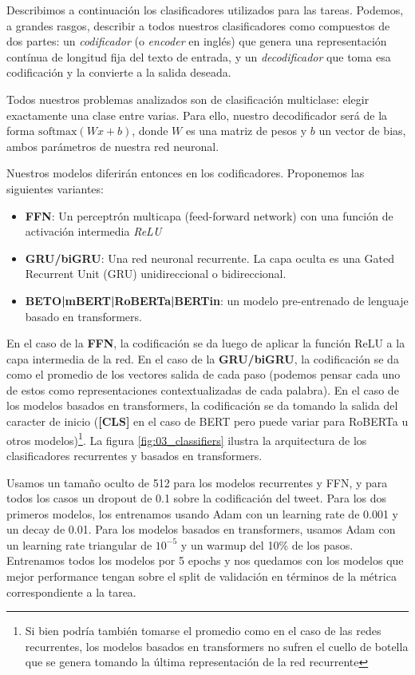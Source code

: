 Describimos a continuación los clasificadores utilizados para las tareas. Podemos, a grandes rasgos, describir a todos nuestros clasificadores como compuestos de dos partes: un \emph{codificador} (o \emph{encoder} en inglés) que genera una representación contínua de longitud fija del texto de entrada, y un \emph{decodificador} que toma esa codificación y la convierte a la salida deseada.

Todos nuestros problemas analizados son de clasificación multiclase: elegir exactamente una clase entre varias. Para ello, nuestro decodificador será de la forma $\text{softmax}(Wx + b)$, donde $W$ es una matriz de pesos y $b$ un vector de bias, ambos parámetros de nuestra red neuronal.

Nuestros modelos diferirán entonces en los codificadores. Proponemos las siguientes variantes:

\begin{itemize}
    \item \textbf{FFN}: Un perceptrón multicapa (feed-forward network) con una función de activación intermedia \emph{ReLU}
    \item \textbf{GRU/biGRU}: Una red neuronal recurrente. La capa oculta es una Gated Recurrent Unit (GRU) unidireccional o bidireccional.
    \item \textbf{BETO|mBERT|RoBERTa|BERTin}: un modelo pre-entrenado de lenguaje basado en transformers.
\end{itemize}

En el caso de la \textbf{FFN}, la codificación se da luego de aplicar la función ReLU a la capa intermedia de la red. En el caso de la \textbf{GRU/biGRU}, la codificación se da como el promedio de los vectores salida de cada paso (podemos pensar cada uno de estos como representaciones contextualizadas de cada palabra). En el caso de los modelos basados en transformers, la codificación se da tomando la salida del caracter de inicio (\textbf{[CLS]} en el caso de BERT pero puede variar para RoBERTa u otros modelos)\footnote{Si bien podría también tomarse el promedio como en el caso de las redes recurrentes, los modelos basados en transformers no sufren el cuello de botella que se genera tomando la última representación de la red recurrente}. La figura \ref{fig:03_classifiers} ilustra la arquitectura de los clasificadores recurrentes y basados en transformers.

Usamos un tamaño oculto de 512 para los modelos recurrentes y FFN, y para todos los casos un dropout \cite{srivastava2014dropout} de 0.1 sobre la codificación del tweet. Para los dos primeros modelos, los entrenamos usando Adam \cite{kingma2014adam} con un learning rate de 0.001 y un decay de 0.01. Para los modelos basados en transformers, usamos Adam con un learning rate triangular de $10^{-5}$ y un warmup del 10\% de los pasos. Entrenamos todos los modelos por 5 epochs y nos quedamos con los modelos que mejor performance tengan sobre el split de validación en términos de la métrica correspondiente a la tarea.

